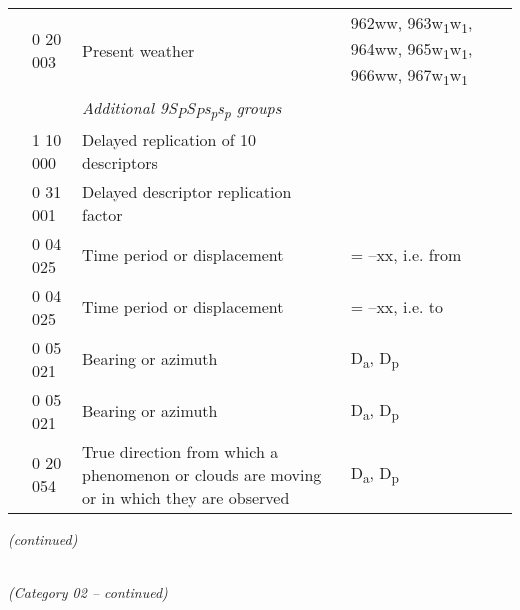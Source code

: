 \begin{longtable}[]{@{}llll@{}}
& 0 20 003 & Present weather & 962ww, 963w\textsubscript{1}w\textsubscript{1}, 964ww, 965w\textsubscript{1}w\textsubscript{1}, 966ww, 967w\textsubscript{1}w\textsubscript{1}\tabularnewline
& & \emph{Additional 9S\textsubscript{P}S\textsubscript{P}s\textsubscript{p}s\textsubscript{p} groups} &\tabularnewline
& 1 10 000 & Delayed replication of 10 descriptors &\tabularnewline
& 0 31 001 & Delayed descriptor replication factor &\tabularnewline
& 0 04 025 & Time period or displacement & = --xx, i.e. from\tabularnewline
& 0 04 025 & Time period or displacement & = --xx, i.e. to\tabularnewline
& 0 05 021 & Bearing or azimuth & D\textsubscript{a}, D\textsubscript{p}\tabularnewline
& 0 05 021 & Bearing or azimuth & D\textsubscript{a}, D\textsubscript{p}\tabularnewline
& 0 20 054 & True direction from which a phenomenon or clouds are moving or in which they are observed & D\textsubscript{a}, D\textsubscript{p}\tabularnewline
\bottomrule
\end{longtable}

\emph{(continued)}

\emph{\\
(Category 02 -- continued)}

